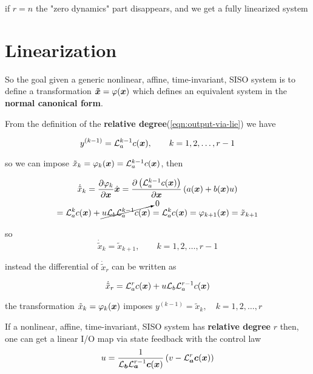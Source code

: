 \begin{nb}if $r=n$ the "zero dynamics" part disappears, and we get a fully linearized system\end{nb}

\section{Linearization}

So the goal given a generic nonlinear, affine, time-invariant, SISO system is to define a transformation $\boldsymbol{\tilde x} = \varphi(\boldsymbol{x})$ which defines an equivalent system in the \textbf{normal canonical form}.

From the definition of the \textbf{relative degree}(\cref{eqn:output-via-lie}) we have

\[
    y^{(k-1)}=\mathcal{L}_{a}^{k-1} c(\boldsymbol{x}),\qquad k = 1,2,\dots, r-1
\]

so we can impose $\tilde x_k =\varphi_k(\boldsymbol{x}) = \mathcal{L}_{a}^{k-1} c(\boldsymbol{x})$, then

\begin{multline*}
    \dot{\tilde x}_k =
    \frac{\partial \varphi_k}{\partial \boldsymbol{x}} \dot{\boldsymbol{x}} =
    \frac{\partial \left( \mathcal{L}_{a}^{k-1} c(\boldsymbol{x}) \right)}{\partial \boldsymbol{x}} \left( a(\boldsymbol{x}) + b(\boldsymbol{x}) u \right) \\ =
    \mathcal{L}_{a}^k c(\boldsymbol{x}) + \cancelto{0}{u \mathcal{L}_{b}\mathcal{L}_{a}^{k-1} c(\boldsymbol{x})} =
    \mathcal{L}_{a}^k c(\boldsymbol{x}) =
    \varphi_{k+1}(\boldsymbol{x}) =
    \tilde x_{k+1}
\end{multline*}

so
\[
    \dot{\tilde x}_k = \tilde x_{k+1},\qquad k = 1,2,\dots, r-1
\]

instead the differential of $\dot{\tilde x}_r$ can be written as

\begin{equation}\label{eqn:newx-r}
    \dot{\tilde x}_r = \mathcal{L}_{a}^r c(\boldsymbol{x}) + u \mathcal{L}_{b}\mathcal{L}_{a}^{r-1} c(\boldsymbol{x})
\end{equation}

\begin{nb}the transformation $\tilde x_k =\varphi_k(\boldsymbol{x})$ imposes $y^{(k-1)} = \tilde x_k,\quad k = 1,2,\dots,r$\end{nb}

\begin{theorem}
If a nonlinear, affine, time-invariant, SISO system has \textbf{relative degree} $r$ then, one can get a linear I/O map via state feedback with the control law
    \[
        u = \frac{1}{\mathcal{L}_{\boldsymbol{b}} \mathcal{L}_{\boldsymbol{a}}^{r-1} \boldsymbol{c}(\boldsymbol{x})} \left( v - \mathcal{L}_{\boldsymbol{a}}^{r} \boldsymbol{c}(\boldsymbol{x}) \right)
    \]
\end{theorem}

